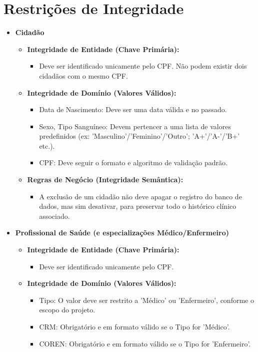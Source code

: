 \documentclass[12pt, a4paper]{article}
\begin{document}
\section{Restrições de Integridade}
\begin{itemize}
    \item \textbf{Cidadão}
    \begin{itemize}
        \item \textbf{Integridade de Entidade (Chave Primária):}
        \begin{itemize}
            \item Deve ser identificado unicamente pelo CPF. Não podem existir dois cidadãos com o mesmo CPF.
        \end{itemize}
        \item \textbf{Integridade de Domínio (Valores Válidos):}
        \begin{itemize}
            \item Data de Nascimento: Deve ser uma data válida e no passado.
            \item Sexo, Tipo Sanguíneo: Devem pertencer a uma lista de valores predefinidos (ex: 'Masculino'/'Feminino'/'Outro'; 'A+'/'A-'/'B+' etc.).
            \item CPF: Deve seguir o formato e algoritmo de validação padrão.
        \end{itemize}
        \item \textbf{Regras de Negócio (Integridade Semântica):}
        \begin{itemize}
            \item A exclusão de um cidadão não deve apagar o registro do banco de dados, mas sim desativar, para preservar todo o histórico clínico associado.
        \end{itemize}
    \end{itemize}

    \item \textbf{Profissional de Saúde (e especializações Médico/Enfermeiro)}
    \begin{itemize}
        \item \textbf{Integridade de Entidade (Chave Primária):}
        \begin{itemize}
            \item Deve ser identificado unicamente pelo CPF.
        \end{itemize}
        \item \textbf{Integridade de Domínio (Valores Válidos):}
        \begin{itemize}
            \item Tipo: O valor deve ser restrito a 'Médico' ou 'Enfermeiro', conforme o escopo do projeto.
            \item CRM: Obrigatório e em formato válido se o Tipo for 'Médico'.
            \item COREN: Obrigatório e em formato válido se o Tipo for 'Enfermeiro'.
        \end{itemize}
    \end{itemize}


\end{itemize}
\end{document}
